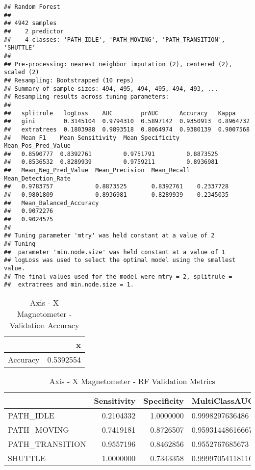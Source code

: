 \documentclass[]{article}
\begin{document}
\begin{verbatim}
## Random Forest 
## 
## 4942 samples
##    2 predictor
##    4 classes: 'PATH_IDLE', 'PATH_MOVING', 'PATH_TRANSITION', 'SHUTTLE' 
## 
## Pre-processing: nearest neighbor imputation (2), centered (2), scaled (2) 
## Resampling: Bootstrapped (10 reps) 
## Summary of sample sizes: 494, 495, 494, 495, 494, 493, ... 
## Resampling results across tuning parameters:
## 
##   splitrule   logLoss    AUC        prAUC      Accuracy   Kappa    
##   gini        0.3145104  0.9794310  0.5897142  0.9350913  0.8964732
##   extratrees  0.1803988  0.9893518  0.8064974  0.9380139  0.9007568
##   Mean_F1    Mean_Sensitivity  Mean_Specificity  Mean_Pos_Pred_Value
##   0.8590777  0.8392761         0.9751791         0.8873525          
##   0.8536532  0.8289939         0.9759211         0.8936981          
##   Mean_Neg_Pred_Value  Mean_Precision  Mean_Recall  Mean_Detection_Rate
##   0.9783757            0.8873525       0.8392761    0.2337728          
##   0.9801809            0.8936981       0.8289939    0.2345035          
##   Mean_Balanced_Accuracy
##   0.9072276             
##   0.9024575             
## 
## Tuning parameter 'mtry' was held constant at a value of 2
## Tuning
##  parameter 'min.node.size' was held constant at a value of 1
## logLoss was used to select the optimal model using the smallest value.
## The final values used for the model were mtry = 2, splitrule =
##  extratrees and min.node.size = 1.
\end{verbatim}

\begin{table}[!h]

\caption{\label{tab:sensor-x-mag-rf-results}Axis - X Magnetometer - Validation Accuracy}
\centering
\begin{tabular}[t]{lr}
\toprule
  & x\\
\midrule
Accuracy & 0.5392554\\
\bottomrule
\end{tabular}
\end{table}

\begin{table}[!h]

\caption{\label{tab:sensor-x-mag-rf-results}Axis - X Magnetometer - RF Validation Metrics}
\centering
\begin{tabular}[t]{lrrl}
\toprule
  & Sensitivity & Specificity & MultiClassAUC\\
\midrule
PATH\_IDLE & 0.2104332 & 1.0000000 & 0.9998297636486\\
PATH\_MOVING & 0.7419181 & 0.8726507 & 0.95931448616667\\
PATH\_TRANSITION & 0.9557196 & 0.8462856 & 0.9552767685673\\
SHUTTLE & 1.0000000 & 0.7343358 & 0.999970541181163\\
\bottomrule
\end{tabular}
\end{table}
\end{document}
